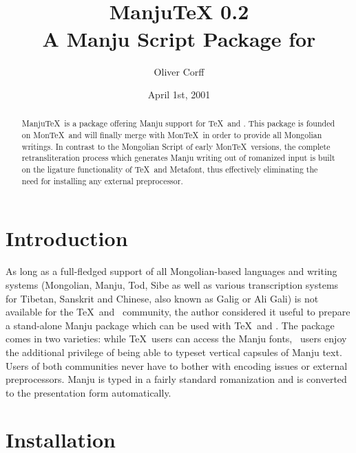 \documentclass[a4paper,11pt]{article}
\title{\mabosoo{manju}\mabosoo{late|h'}\\[0.35cm]
	ManjuTeX 0.2\\[0.35cm]
	A Manju Script Package for \LaTeXe}
\author{Oliver Corff}
\date{April 1st, 2001}
\begin{document}
\maketitle
\begin{abstract}
	Manju\TeX\ is a package offering Manju support for \TeX\ and
	\LaTeXe.  This package is founded on Mon\TeX\ and will
	finally merge with Mon\TeX\ in order to provide all
	Mongolian writings. In contrast to the Mongolian Script
	of early Mon\TeX\ versions, the complete retransliteration
	process which generates Manju writing out of romanized input is
	built on the ligature functionality of \TeX\ and Metafont, thus
	effectively eliminating the need for installing any external
	preprocessor.
\end{abstract}
\tableofcontents

\section{Introduction}

As long as a full-fledged support of all Mongolian-based languages
and writing systems (Mongolian, Manju, Tod, Sibe as well as various
transcription systems for Tibetan, Sanskrit and Chinese, also known
as Galig or Ali Gali) is not available for the \TeX\ and \LaTeXe\
community, the author considered it useful to prepare a stand-alone
Manju package which can be used with \TeX\ and \LaTeXe. The package
comes in two varieties: while \TeX\ users can access the Manju
fonts, \LaTeXe\ users enjoy the additional privilege of being able
to typeset vertical capsules of Manju text. Users of both
communities never have to bother with encoding issues or external
preprocessors. Manju is typed in a fairly standard romanization and
is converted to the presentation form automatically.


\section{Installation\label{Installation}}
\end{document}
